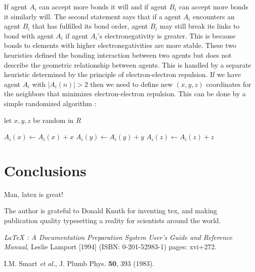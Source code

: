 \documentclass[aps,floatfix,prd,showpacs]{revtex4}
\begin{document}
  If agent $A_i$ can accept more bonds it will and if agent $B_i$ can accept more bonds it similarly will. 
  The second statement says that if a agent $A_i$ encounters an agent $B_i$ that has fulfilled its bond order, agent $B_i$ may still break its links to bond with agent $A_i$ if agent $A_i$'s electronegativity is greater. This is because bonds to elements with higher electronegativities are more stable. These two heuristics defined the bonding interaction between two agents but does not describe the geometric relationship between agents. This is handled by a separate heuristic determined by the principle of electron-electron repulsion. If we have agent $A_i$ with $|A_i(n)| > 2 $ then we need to define new $(x,y,z)$ coordinates for the neighbors that minimizes electron-electron repulsion. This can be done by a simple randomized algorithm :
  \begin{algorithmic}
  \State let $x,y,z$ be random in $R$
  
    \State $A_i(x) \gets A_i(x) + x$
     \State $A_i(y) \gets A_i(y) + y$
      \State $A_i(z) \gets A_i(z) + z$
\EndIf
\EndFor
\end{algorithmic}

\section{Conclusions}

Man, latex is great!

\acknowledgments
The author is grateful to Donald Knuth for inventing tex, and making publication quality typesetting a reality for scientists around the world.


\begin{thebibliography}{99}

 {\sl LaTeX : A Documentation Preparation System User's Guide and Reference Manual}, Leslie Lamport [1994] (ISBN: 0-201-52983-1) pages: xvi+272.

I.M. Smart {\it et al.}, J. Plumb Phys. {\bf 50}, 393 (1983).

\end{thebibliography}
\end{document}
